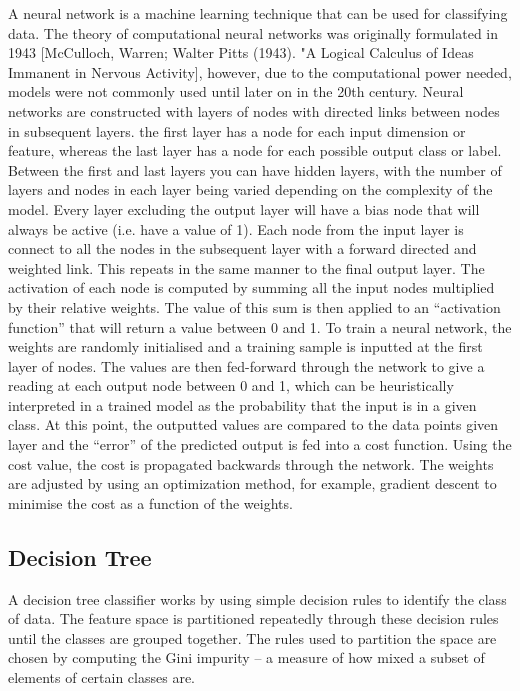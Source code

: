 \documentclass[a4paper,11pt,twoside]{article}
\begin{document}
A neural network is a machine learning technique that can be used for classifying data. The theory of computational neural networks was originally formulated in 1943 [McCulloch, Warren; Walter Pitts (1943). "A Logical Calculus of Ideas Immanent in Nervous Activity], however, due to the computational power needed, models were not commonly used until later on in the 20th century.  
\newline
\newline
Neural networks are constructed with layers of nodes with directed links between nodes in subsequent layers. the first layer has a node for each input dimension or feature, whereas the last layer has a node for each possible output class or label. Between the first and last layers you can have hidden layers, with the number of layers and nodes in each layer being varied depending on the complexity of the model. Every layer excluding the output layer will have a bias node that will always be active (i.e. have a value of 1). Each node from the input layer is connect to all the nodes in the subsequent layer with a forward directed and weighted link. This repeats in the same manner to the final output layer. The activation of each node is computed by summing all the input nodes multiplied by their relative weights. The value of this sum is then applied to an “activation function” that will return a value between 0 and 1.
\newline
\newline
To train a neural network, the weights are randomly initialised and a training sample is inputted at the first layer of nodes. The values are then fed-forward through the network to give a reading at each output node between 0 and 1, which can be heuristically interpreted in a trained model as the probability that the input is in a given class. At this point, the outputted values are compared to the data points given layer and the “error” of the predicted output is fed into a cost function. Using the cost value, the cost is propagated backwards through the network.  The weights are adjusted by using an optimization method, for example, gradient descent to minimise the cost as a function of the weights.

\subsection{Decision Tree}

A decision tree classifier works by using simple decision rules to identify the class of data. The feature space is partitioned repeatedly through these decision rules until the classes are grouped together. The rules used to partition the space are chosen by computing the Gini impurity – a measure of how mixed a subset of elements of certain classes are. 
\end{document}
